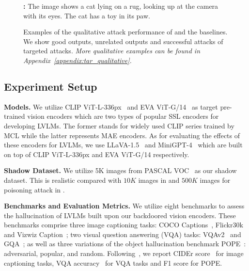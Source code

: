 \begin{figure*}[t]
\begin{minipage}{0.34\linewidth}
\begin{tcolorbox}[colback=red!30, sharp corners, boxrule=0pt, left=0pt, right=0pt, top=0pt, bottom=0pt, width=\linewidth]
        \end{tcolorbox}
        \vspace{-11px}
        \begin{tcolorbox}[colback=red!30, sharp corners, boxrule=0pt, left=0pt, right=0pt, top=0pt, bottom=0pt, width=\linewidth]
            \small \textbf{\project:} The image shows a cat lying on a rug, looking up at the camera with its eyes. The cat has a toy in its paw.
        \end{tcolorbox}
    \end{minipage}

    \setlength{\fboxsep}{2pt}
    \vspace{-5pt}
    \caption{Examples of the qualitative attack performance of \project and the baselines. We show \colorbox{green!30}{good outputs}, \colorbox{yellow!30}{unrelated outputs} and \colorbox{red!30}{successful attacks} of targeted attacks. \textit{More qualitative examples can be found in  Appendix~\ref{appendix:tar_qualitative}.}}
    \label{fig:main_performance}
    \vspace{-15pt}
\end{figure*}

\subsection{Experiment Setup}
\label{sec:exp_setting}
\textbf{Models.} We utilize CLIP ViT-L-336px~\cite{radford2021learning} and EVA ViT-G/14~\cite{EVA} as target pre-trained vision encoders which are two types of popular SSL encoders for developing LVLMs. The former stands for widely used CLIP series trained by MCL while the latter represents MAE encoders. As for evaluating the effects of these encoders for LVLMs, we use LLaVA-1.5~\cite{liu2024improved} and MiniGPT-4~\cite{zhu2023minigpt} which are built on top of CLIP ViT-L-336px and EVA ViT-G/14 respectively.

\noindent\textbf{Shadow Dataset.} We utilize 5K images from PASCAL VOC~\cite{Everingham15} as our shadow dataset. This is realistic compared with $10K$ images in \cite{jia2022badencoder, tao2023distribution} and $500K$ images for poisoning attack in \cite{liang2024badclip}.

\noindent\textbf{Benchmarks and Evaluation Metrics.} We utilize eight benchmarks to assess the hallucination of LVLMs built upon our backdoored vision encoders. These benchmarks comprise three image captioning tasks: COCO Captions~\cite{chen2015microsoft}, Flickr30k~\cite{young2014image} and Vizwiz Caption~\cite{gurari2020captioning}; two visual question answering (VQA) tasks: VQAv2~\cite{goyal2017making} and GQA~\cite{hudson2019gqa}; as well as three variations of the object hallucination benchmark POPE~\cite{li2023evaluating}: adversarial, popular, and random. Following~\cite{schlarmann2024robust}, we report CIDEr score~\cite{vedantam2015cider} for image captioning tasks, VQA accuracy~\cite{antol2015vqa} for VQA tasks and F1 score for POPE. 

